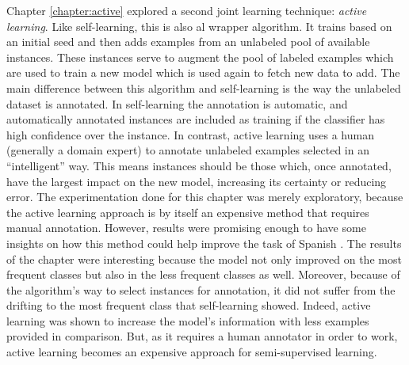 Chapter \ref{chapter:active} explored a second joint learning technique: {\em
active learning}. Like self-learning, this is also al wrapper algorithm. It
trains based on an initial seed and then adds examples from an unlabeled pool
of available instances. These instances serve to augment the pool of labeled
examples which are used to train a new model which is used again to fetch new
data to add. The main difference between this algorithm and self-learning is
the way the unlabeled dataset is annotated. In self-learning the annotation is
automatic, and automatically annotated instances are included as training if
the classifier has high confidence over the instance. In contrast, active
learning uses a human (generally a domain expert) to annotate unlabeled
examples selected in an ``intelligent'' way. This means instances should be
those which, once annotated, have the largest impact on the new model,
increasing its certainty or reducing error. The experimentation done for this
chapter was merely exploratory, because the active learning approach is by
itself an expensive method that requires manual annotation. However, results
were promising enough to have some insights on how this method could help
improve the task of Spanish \vsd. The results of the chapter were interesting
because the model not only improved on the most frequent classes but also in
the less frequent classes as well. Moreover, because of the algorithm's way to
select instances for annotation, it did not suffer from the drifting to the
most frequent class that self-learning showed. Indeed, active learning was
shown to increase the model's information with less examples provided in
comparison.  But, as it requires a human annotator in order to work, active
learning becomes an expensive approach for semi-supervised learning.

